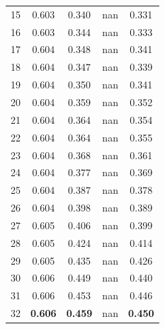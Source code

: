 \documentclass[11pt,a4paper]{article}
\begin{document}
\begin{table}[H]
\begin{tabular}{rcccc}
15 & 0.603 & 0.340 & nan & 0.331 \\

16 & 0.603 & 0.344 & nan & 0.333 \\

17 & 0.604 & 0.348 & nan & 0.341 \\

18 & 0.604 & 0.347 & nan & 0.339 \\

19 & 0.604 & 0.350 & nan & 0.341 \\

20 & 0.604 & 0.359 & nan & 0.352 \\

21 & 0.604 & 0.364 & nan & 0.354 \\

22 & 0.604 & 0.364 & nan & 0.355 \\

23 & 0.604 & 0.368 & nan & 0.361 \\

24 & 0.604 & 0.377 & nan & 0.369 \\

25 & 0.604 & 0.387 & nan & 0.378 \\

26 & 0.604 & 0.398 & nan & 0.389 \\

27 & 0.605 & 0.406 & nan & 0.399 \\

28 & 0.605 & 0.424 & nan & 0.414 \\

29 & 0.605 & 0.435 & nan & 0.426 \\

30 & 0.606 & 0.449 & nan & 0.440 \\

31 & 0.606 & 0.453 & nan & 0.446 \\

32 & \textbf{0.606} & \textbf{0.459} & nan & \textbf{0.450} \\

\bottomrule

\end{tabular}

\end{table}
\end{document}
